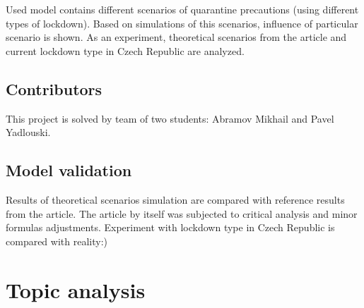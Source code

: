 \documentclass[12pt,a4paper,english]{article}
\newcommand{\todo}[1]{\textcolor{red}{[[\textbf{TODO} \textbf{#1]]}}}
\begin{document}
    Used model contains different scenarios of quarantine precautions (using different types of lockdown).
    Based on simulations of this scenarios, influence of particular scenario is shown. 
    As an experiment, theoretical scenarios from the article and current lockdown type in Czech Republic are analyzed.

    \subsection{Contributors}    
    This project is solved by team of two students: Abramov Mikhail and Pavel 
    Yadlouski.

    \subsection{Model validation}
    Results of theoretical scenarios simulation are compared with reference results from the article. 
    The article by itself was subjected to critical analysis and minor formulas adjustments.
    Experiment with lockdown type in Czech Republic is compared with reality:) 
    
    
    \section{Topic analysis}
    
\end{document}
